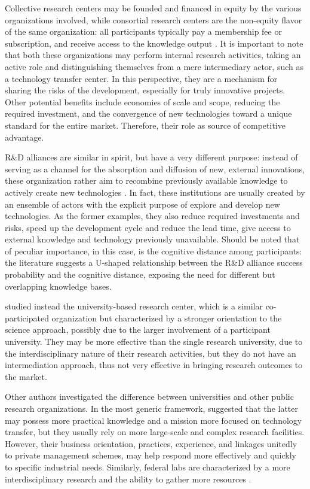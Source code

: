 Collective research centers may be founded and financed in equity by the various organizations involved, while consortial research centers are the non-equity flavor of the same organization: all participants typically pay a membership fee or subscription, and receive access to the knowledge output \citep{Hayton2013}. It is important to note that both these organizations may perform internal research activities, taking an active role and distinguishing themselves from a mere intermediary actor, such as a technology transfer center. In this perspective, they are a mechanism for sharing the risks of the development, especially for truly innovative projects. Other potential benefits include economies of scale and scope, reducing the required investment, and the convergence of new technologies toward a unique standard for the entire market. Therefore, their role as source of competitive advantage.

R\&D alliances are similar in spirit, but have a very different purpose: instead of serving as a channel for the absorption and diffusion of new, external innovations, these organization rather aim to recombine previously available knowledge to actively create new technologies \citep{Lin2012}. In fact, these institutions are usually created by an ensemble of actors with the explicit purpose of explore and develop new technologies. As the former examples, they also reduce required investments and risks, speed up the development cycle and reduce the lead time, give access to external knowledge and technology previously unavailable. Should be noted that of peculiar importance, in this case, is the cognitive distance among participants: the literature suggests a U-shaped relationship between the R\&D alliance success probability and the cognitive distance, exposing the need for different but overlapping knowledge bases.

\citet{Rogers2001} studied instead the university-based research center, which is a similar co-participated organization but characterized by a stronger orientation to the science approach, possibly due to the larger involvement of a participant university. They may be more effective than the single research university, due to the interdisciplinary nature of their research activities, but they do not have an intermediation approach, thus not very effective in bringing research outcomes to the market.

Other authors investigated the difference between universities and other public research organizations. In the most generic framework, \citet{Teirlinck2012} suggested that the latter may possess more practical knowledge and a mission more focused on technology transfer, but they usually rely on more large-scale and complex research facilities. However, their business orientation, practices, experience, and linkages \citep{Debackere2005} unitedly to private management schemes, may help respond more effectively and quickly to specific industrial needs. Similarly, federal labs are characterized by a more interdisciplinary research and the ability to gather more resources \citep{Bozeman2000}.

